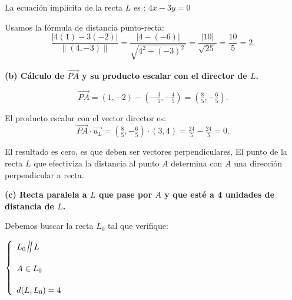 \documentclass[11pt]{article}
\newcommand{\indicador}[4]{
{\tikz[remember picture,overlay]\coordinate (#1) at #2;}{\tikz[remember picture,overlay]\coordinate (#3) at #4;} 
}
\newcommand{\marka}[2]{
{\tikz[remember picture,overlay]\coordinate (#1) at #2;}
}
\newcommand{\paralela}{\rotatebox[origin=c]{-10}{\Large$\parallel$}}
\begin{document}
\begin{enumerate}[\hspace{-5mm} 1) ]
\begin{tcolorbox}[colback=white,colframe=red!60!black,title= \textbf{Observaciones:}]
\hfill La ecuación implícita de la recta $L$ es : $ 4 x -3y  =  0 $

Usamos la fórmula de distancia punto-recta:
\[ \frac{ \left|4(1) - 3(-2) \right|  }{\| (4,-3) \|} = \frac{ \left|4-  (-6) \right|  }{\sqrt{4^2+(-3)^2\,}} =   \frac{ \left|10 \right|  }{\sqrt{25\,}} = \frac{10}{5} = 2. \]


\end{tcolorbox}












\bigskip 


\textbf{(b) Cálculo de $\overrightarrow{PA}$ y su producto escalar con el director de $L$.}

\[ \overrightarrow{PA} = (1,-2) - \left(-\tfrac{3}{5},  -\tfrac{4}{5} \right) = (\tfrac{8}{5},-\tfrac{6}{5}). \]

El producto escalar con el vector director es:
\[ \overrightarrow{PA} \cdot \overrightarrow{u_L} = (\tfrac{8}{5},-\tfrac{6}{5}) \cdot (3,4) =\tfrac{24}{5}- \tfrac{24}{5}= 0. \]

El resultado es cero, es que deben ser vectores perpendiculares, El punto de la recta $L$ que efectiviza la distancia al punto $A$ determina con $A$ una dirección perpendicular a recta. 





\bigskip


\textbf{(c) Recta paralela a $L$ que pase por $A$ y que esté a 4 unidades de distancia de $L$.} 


Debemos buscar la recta $L_0$ tal que verifique: 

$
\left\{
\begin{array}{l} 
L_0 \paralela  L  \indicador{A}{(.1,.15)}{B}{(1.5,.15)} 
\\[5mm] 
A \in L_0 \marka{a}{(.1,.25)} \indicador{c}{(1.6,.15)}{d}{(2.3,.15)}
\\[5mm]
 d(L, L_0 ) =  4  \marka{b}{(.1,.15)} 
\end{array}
\right.
$





\end{enumerate}
\end{document}
